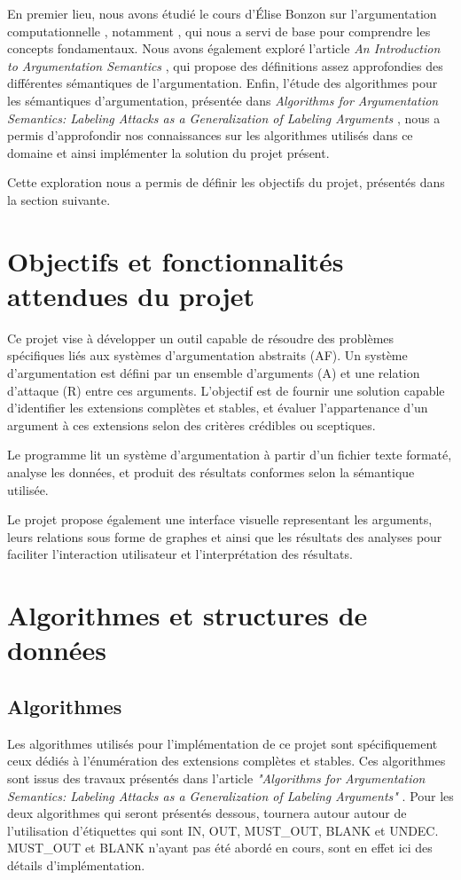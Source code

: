 \documentclass{rapportECL}
\begin{document}
En premier lieu, nous avons étudié le cours d'Élise Bonzon sur l'argumentation computationnelle \cite{a}, notamment , qui nous a servi de base pour comprendre les concepts fondamentaux. 
Nous avons également exploré l'article \textit{An Introduction to Argumentation Semantics} \cite{b}, qui propose des définitions assez approfondies des différentes sémantiques de l'argumentation. 
Enfin, l’étude des algorithmes pour les sémantiques d'argumentation, présentée dans \textit{Algorithms for Argumentation Semantics: Labeling Attacks as a Generalization of Labeling Arguments} \cite{c}, 
nous a permis d’approfondir nos connaissances sur les algorithmes utilisés dans ce domaine et ainsi implémenter la solution du projet présent. 

Cette exploration nous a permis de définir les objectifs du projet, présentés dans la section suivante.

\section{Objectifs et fonctionnalités attendues du projet}
Ce projet vise à développer un outil capable de résoudre des problèmes spécifiques liés aux systèmes d'argumentation abstraits (AF). 
Un système d'argumentation est défini par un ensemble d'arguments (A) et une relation d'attaque (R) entre ces arguments. 
L'objectif est de fournir une solution capable d’identifier les extensions complètes et stables, et évaluer l’appartenance 
d’un argument à ces extensions selon des critères crédibles ou sceptiques.

Le programme lit un système d'argumentation à partir d'un fichier texte formaté, analyse les données, et produit des résultats conformes selon la sémantique utilisée. 


Le projet propose également une interface visuelle  representant les arguments, leurs relations sous forme de graphes et ainsi que les résultats des analyses pour faciliter l’interaction utilisateur et l’interprétation des résultats.

\section{Algorithmes et structures de données} 


\subsection{Algorithmes}
Les algorithmes utilisés pour l'implémentation de ce projet sont spécifiquement ceux dédiés à l'énumération des extensions complètes 
et stables. Ces algorithmes sont issus des travaux présentés dans l'article 
\textit{"Algorithms for Argumentation Semantics: Labeling Attacks as a Generalization of Labeling Arguments"}  \cite{c}.
Pour les deux algorithmes qui seront présentés dessous, tournera autour autour de l'utilisation d'étiquettes qui sont IN, OUT,  {MUST\_OUT}, BLANK et UNDEC.
{MUST\_OUT} et BLANK n'ayant pas été abordé en cours, sont en effet ici des détails d'implémentation.
\end{document}
